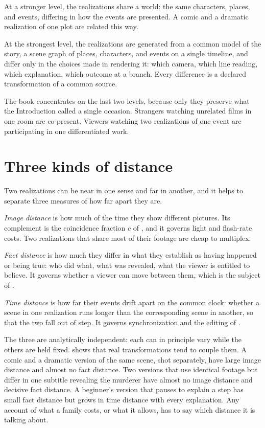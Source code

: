 At a stronger level, the realizations share a world: the same characters, places, and events, differing in how the events are presented. A comic and a dramatic realization of one plot are related this way.

At the strongest level, the realizations are generated from a common model of the story, a scene graph of places, characters, and events on a single timeline, and differ only in the choices made in rendering it: which camera, which line reading, which explanation, which outcome at a branch. Every difference is a declared transformation of a common source.

The book concentrates on the last two levels, because only they preserve what the Introduction called a single occasion. Strangers watching unrelated films in one room are co-present. Viewers watching two realizations of one event are participating in one differentiated work.

\section{Three kinds of distance}

Two realizations can be near in one sense and far in another, and it helps to separate three measures of how far apart they are.

\emph{Image distance} is how much of the time they show different pictures. Its complement is the coincidence fraction $c$ of , and it governs light and flash-rate costs. Two realizations that share most of their footage are cheap to multiplex.

\emph{Fact distance} is how much they differ in what they establish as having happened or being true: who did what, what was revealed, what the viewer is entitled to believe. It governs whether a viewer can move between them, which is the subject of .

\emph{Time distance} is how far their events drift apart on the common clock: whether a scene in one realization runs longer than the corresponding scene in another, so that the two fall out of step. It governs synchronization and the editing of .

The three are analytically independent: each can in principle vary while the others are held fixed.  shows that real transformations tend to couple them. A comic and a dramatic version of the same scene, shot separately, have large image distance and almost no fact distance. Two versions that use identical footage but differ in one subtitle revealing the murderer have almost no image distance and decisive fact distance. A beginner's version that pauses to explain a step has small fact distance but grows in time distance with every explanation. Any account of what a family costs, or what it allows, has to say which distance it is talking about.

